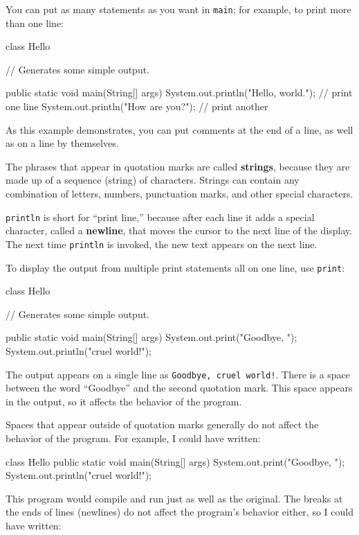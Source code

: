 \documentclass{book}
\begin{document}
You can put as many
statements as you want in {\tt main}; for example, to
print more than one line:

\begin{verbatimtab}
class Hello {

  // Generates some simple output.

  public static void main(String[] args) {
    System.out.println("Hello, world.");     // print one line
    System.out.println("How are you?");      // print another
  }
}
\end{verbatimtab}
%
As this example demonstrates, you can put comments at the
end of a line, as well as on a line by themselves.


The phrases that appear in quotation marks are called {\bf strings},
because they are made up of a sequence (string) of characters.
Strings can contain any combination of letters, numbers, punctuation
marks, and other special characters.


{\tt println} is short for ``print line,'' because after each
line it adds a special character, called a {\bf newline}, that
moves the cursor to the next line of the display.
The next time {\tt println} is invoked, the new text appears
on the next line.

To display the output from multiple print
statements all on one line, use {\tt print}:

\begin{verbatimtab}
class Hello {

  // Generates some simple output.

  public static void main(String[] args) {
    System.out.print("Goodbye, ");
    System.out.println("cruel world!");
  }
}
\end{verbatimtab}
%
The output appears on a single line as
{\tt Goodbye, cruel world!}.  There is a space
between the word ``Goodbye'' and the second quotation mark.
This space appears in the output, so it affects the behavior
of the program.

Spaces that appear outside of quotation marks generally do
not affect the behavior of the program.  For example, I
could have written:

\begin{verbatimtab}
class Hello {
public static void main(String[] args) {
System.out.print("Goodbye, ");
System.out.println("cruel world!");
}
}
\end{verbatimtab}
%
This program would compile and run just as well as the original.
The breaks at the ends of lines (newlines) do not affect
the program's behavior either, so I could have written:
\end{document}
